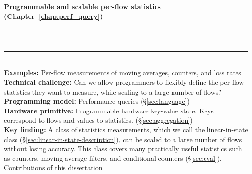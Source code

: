 \begin{table}
\textbf{Programmable and scalable per-flow statistics (Chapter~\ref{chap:perf_query})}
\\[-7pt]\rule{\textwidth}{1pt}\\[-7pt]\rule{\textwidth}{1pt} \\
\textbf{Examples:} Per-flow measurements of moving averages, counters, and loss rates \\
\textbf{Technical challenge:} Can we allow programmers to flexibly define the per-flow
statistics they want to measure, while scaling to a large number of flows?\\
\textbf{Programming model:} Performance queries (\S\ref{sec:language}) \\
\textbf{Hardware primitive:} Programmable hardware key-value store. Keys correspond to
flows and values to statistics. (\S\ref{sec:aggregation}) \\
\textbf{Key finding:} A class of statistics measurements, which we call the linear-in-state
class (\S\ref{sec:linear-in-state-description}), can be scaled
to a large number of flows without losing accuracy. This class
covers many practically useful statistics such as counters, moving average filters, and
conditional counters (\S\ref{sec:eval}). \\
\caption{Contributions of this dissertation}
\label{tab:contributions}
\end{table}


